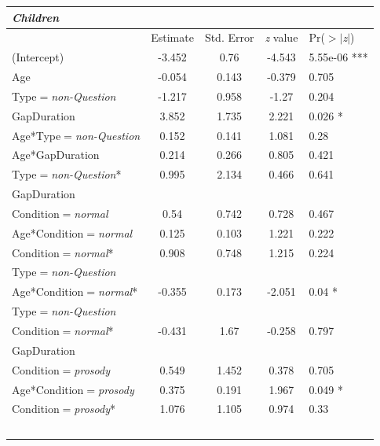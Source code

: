 \documentclass[authoryear, 12pt]{elsarticle}
\begin{document}
\linespread{1}
\begin{minipage}[t]{0.95\linewidth}
\begin{footnotesize}
\begin{longtable}{lcccl}
  \textbf{\textit{Children}} &&&& \\
    \hline
           &  Estimate & Std. Error & \textit{z} value & Pr($>$$|$\textit{z}$|$) \\    
    \hline
    (Intercept)											& -3.452		& 0.76	& -4.543	& 5.55e-06 ***	\\
    Age														& -0.054		& 0.143	& -0.379	& 0.705				\\
    Type$=$\textit{non-Question}				& -1.217		& 0.958	& -1.27		& 0.204				\\
    GapDuration											&  3.852		& 1.735	&  2.221	& 0.026 *			\\
    Age*Type$=$\textit{non-Question}			&  0.152		& 0.141	&  1.081	& 0.28				\\
    Age*GapDuration									&  0.214		& 0.266	&  0.805	& 0.421				\\
    Type$=$\textit{non-Question}*				&  0.995		& 2.134	&  0.466	& 0.641				\\
    \hspace*{5mm} GapDuration &&&& \\
	\hline
    Condition$=$\textit{normal}					&  0.54		& 0.742	&  0.728	& 0.467					\\
    Age*Condition$=$\textit{normal}			&  0.125		& 0.103	&  1.221	& 0.222				\\
    Condition$=$\textit{normal}*				&  0.908		& 0.748	&  1.215	& 0.224				\\
    \hspace*{5mm} Type$=$\textit{non-Question} &&&& \\
    Age*Condition$=$\textit{normal}*			& -0.355		& 0.173	& -2.051	& 0.04 *			\\
    \hspace*{5mm} Type$=$\textit{non-Question} &&&& \\
    Condition$=$\textit{normal}*				& -0.431		& 1.67	& -0.258	& 0.797				\\
    \hspace*{5mm} GapDuration &&&& \\
	\hline
    Condition$=$\textit{prosody}				&  0.549		& 1.452	&  0.378	& 0.705				\\
    Age*Condition$=$\textit{prosody}			&  0.375		& 0.191	&  1.967	& 0.049 *			\\
    Condition$=$\textit{prosody}*				&  1.076		& 1.105	&  0.974	& 0.33				\\
$$
\end{longtable}
\end{footnotesize}
\end{minipage}
\end{document}
